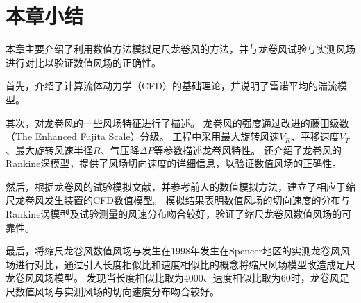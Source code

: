\section{本章小结}
本章主要介绍了利用数值方法模拟足尺龙卷风的方法，并与龙卷风试验与实测风场进行对比以验证数值风场的正确性。

首先，介绍了计算流体动力学（CFD）的基础理论，并说明了雷诺平均的湍流模型。

其次，对龙卷风的一些风场特征进行了描述。
龙卷风的强度通过改进的藤田级数（The Enhanced Fujita Scale）分级。
工程中采用最大旋转风速$V_R$、平移速度$V_T$、最大旋转风速半径$R$、气压降$\Delta P$等参数描述龙卷风特性。
还介绍了龙卷风的Rankine涡模型，提供了风场切向速度的详细信息，以验证数值风场的正确性。

然后，根据龙卷风的试验模拟文献，并参考前人的数值模拟方法，建立了相应于缩尺龙卷风发生装置的CFD数值模型。
模拟结果表明数值风场的切向速度的分布与Rankine涡模型及试验测量的风速分布吻合较好，验证了缩尺龙卷风数值风场的可靠性。

最后，将缩尺龙卷风数值风场与发生在1998年发生在Spencer地区的实测龙卷风风场进行对比，通过引入长度相似比和速度相似比的概念将缩尺风场模型改造成足尺龙卷风风场模型。
发现当长度相似比取为$4000$、速度相似比取为$60$时，龙卷风足尺数值风场与实测风场的切向速度分布吻合较好。

